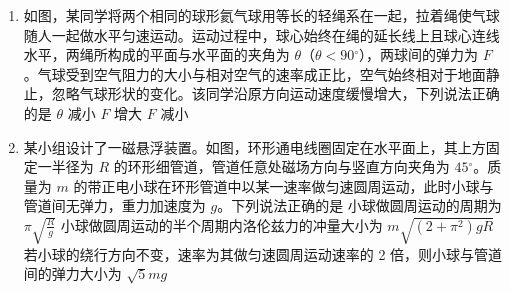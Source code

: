 \documentclass[\gkver]{gaokaozhenti}
\begin{document}
\begin{enumerate}
{B．一定量的水变为同温度的水蒸气，温度不变则分子总动能不变。汽化过程吸收热量，且汽化后分子间距大幅增大，分子势能增加，因此总内能变大，故 B 正确；

C．该过程中，均热板从高温的芯片吸热，向低温的冷凝端放热，整个过程循环进行，均热板自身状态复原，不需要对外界做功，仅依靠水传递热量，符合物理规律，故 C 正确；

D．根据热力学第二定律，不可能从低温物体吸热、向高温物体放热，同时不产生其他影响，该描述违反热力学第二定律，故 D 错误。

故选 BC。
}
\item
如图，某同学将两个相同的球形氦气球用等长的轻绳系在一起，拉着绳使气球随人一起做水平匀速运动。运动过程中，球心始终在绳的延长线上且球心连线水平，两绳所构成的平面与水平面的夹角为 $\theta$（$\theta < 90{^\circ}$），两球间的弹力为 $F$。气球受到空气阻力的大小与相对空气的速率成正比，空气始终相对于地面静止，忽略气球形状的变化。该同学沿原方向运动速度缓慢增大，下列说法正确的是 
\onepicture[h=4.12cm]{}
{$\theta$ 减小}
{$F$ 增大}
{$F$ 减小}
\item
某小组设计了一磁悬浮装置。如图，环形通电线圈固定在水平面上，其上方固定一半径为 $R$ 的环形细管道，管道任意处磁场方向与竖直方向夹角为 $45{^\circ}$。质量为 $m$ 的带正电小球在环形管道中以某一速率做匀速圆周运动，此时小球与管道间无弹力，重力加速度为 $g$。下列说法正确的是 
\onepicture[w=5.50cm]{}
{小球做圆周运动的周期为 $\pi\sqrt{\frac{R}{g}}$}
{小球做圆周运动的半个周期内洛伦兹力的冲量大小为 $m\sqrt{(2 + \pi^{2})gR}$}
{若小球的绕行方向不变，速率为其做匀速圆周运动速率的 2 倍，则小球与管道间的弹力大小为 $\sqrt{5}mg$}
\end{enumerate}
\end{document}
